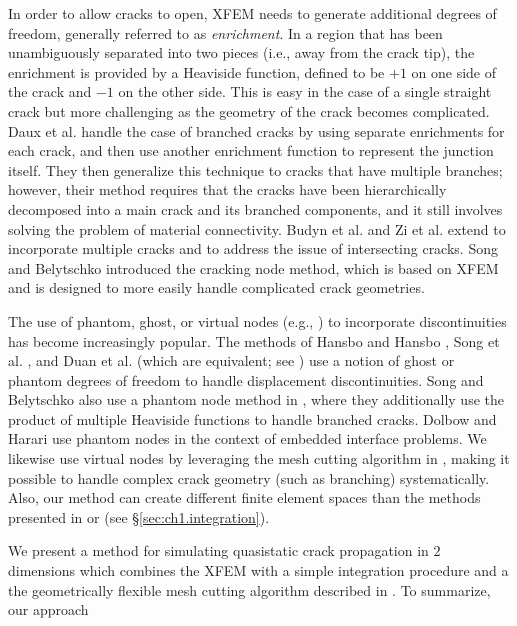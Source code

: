 In order to allow cracks to open, XFEM needs to generate additional degrees of freedom, generally referred to as \emph{enrichment}. In a region that has been unambiguously separated into two pieces (i.e., away from the crack tip), the enrichment is provided by a Heaviside function, defined to be $+1$ on one side of the crack and $-1$ on the other side. This is easy in the case of a single straight crack but more challenging as the geometry of the crack becomes complicated. Daux et al. \cite{Daux00} handle the case of branched cracks by using separate enrichments for each crack, and then use another enrichment function to represent the junction itself. They then generalize this technique to cracks that have multiple branches; however, their method requires that the cracks have been hierarchically decomposed into a main crack and its branched components, and it still involves solving the problem of material connectivity. Budyn et al. \cite{Budyn04} and Zi et al. \cite{Zi.G04} extend \cite{Daux00} to incorporate multiple cracks and to address the issue of intersecting cracks. Song and Belytschko \cite{Song09a} introduced the cracking node method, which is based on XFEM and is designed to more easily handle complicated crack geometries.

The use of phantom, ghost, or virtual nodes (e.g., \cite{Molino05}) to incorporate discontinuities has become increasingly popular. The methods of Hansbo and Hansbo \cite{Hansbo04}, Song et al. \cite{Song06}, and Duan et al. \cite{Duan09} (which are equivalent; see \cite{Areias06}) use a notion of ghost or phantom degrees of freedom to handle displacement discontinuities. Song and Belytschko also use a phantom node method in \cite{Song09b}, where they additionally use the product of multiple Heaviside functions to handle branched cracks. Dolbow and Harari \cite{Dolbow09} use phantom nodes in the context of embedded interface problems. We likewise use virtual nodes by leveraging the mesh cutting algorithm in \cite{Sifakis07}, making it possible to handle complex crack geometry (such as branching) systematically. Also, our method can create different finite element spaces than the methods presented in \cite{Hansbo04} or \cite{Song06} (see \S\ref{sec:ch1.integration}).

We present a method for simulating quasistatic crack propagation in $2$ dimensions which combines the XFEM with a simple integration procedure and a the geometrically flexible mesh cutting algorithm described in \cite{Sifakis07}. To summarize, our approach

